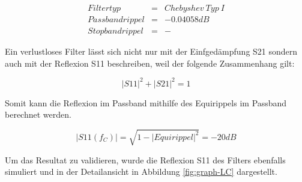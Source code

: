 \begin{mdframed}
    \begin{equation*} 
        \begin{array}{rclcl} 
            Filtertyp & = & Chebyshev\ Typ\ I\\
            Passbandrippel & = & -0.04058 dB \\ 
            Stopbandrippel & = & - 
        \end{array} 
    \end{equation*} 
\end{mdframed}

Ein verlustloses Filter  lässt  sich  nicht  nur  mit  der  Einfgedämpfung S21
sondern auch mit der Reflexion S11 beschreiben, weil der folgende Zusammenhang
gilt:

\begin{equation}
    {|S11|}^2 + {|S21|}^2 = 1
\end{equation}

Somit  kann  die  Reflexion im Passband mithilfe des Equirippels  im  Passband
berechnet werden.

\begin{equation}
    |S11(f_C)| = \sqrt{1-{|Equirippel|}^2} = -20 dB
\end{equation}

Um das Resultat zu validieren, wurde die Reflexion S11  des  Filters ebenfalls
simuliert   und   in  der  Detailansicht   in   Abbildung   \ref{fig:graph-LC}
dargestellt.

